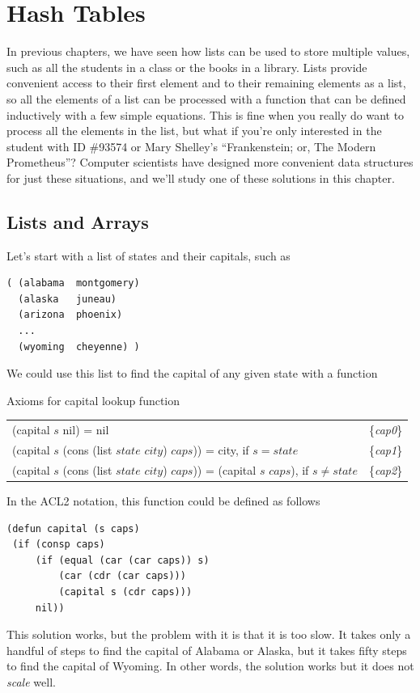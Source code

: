 \chapter{Hash Tables}
\label{ch:hash-tables}

In previous chapters, we have seen how lists can be used to store
multiple values, such as all the students in a class or the books
in a library. Lists provide convenient access to their first element 
and to their remaining elements as a list, so all the elements of a 
list can be processed with a function that can be defined inductively
with a few simple equations.  This is fine when you really do want to 
process all the elements in the list, but what if you're only interested 
in the student with ID \#93574 or Mary Shelley's ``Frankenstein; or, 
The Modern Prometheus''? Computer scientists have designed more convenient
data structures for just these situations, and we'll study one of these
solutions in this chapter. 

\section{Lists and Arrays}

Let's start with a list of states and their capitals, such as
\begin{Verbatim}
( (alabama  montgomery)
  (alaska   juneau)
  (arizona  phoenix)
  ...
  (wyoming  cheyenne) )
\end{Verbatim}
We could use this list to find the capital of any given state with a
function 
\begin{center}
Axioms for capital lookup function
\begin{tabular}{ll}
(capital $s$ nil) = nil  & \{\emph{cap0}\}     \\
(capital $s$ (cons (list $state$ $city$) $caps$)) = city, if $s=state$ & \{\emph{cap1}\} \\
(capital $s$ (cons (list $state$ $city$) $caps$)) = (capital $s$ $caps$), if $s \ne state$ & \{\emph{cap2}\} \\
\end{tabular}
\end{center}
In the ACL2 notation, this function could be defined as follows
\begin{Verbatim}
(defun capital (s caps)
 (if (consp caps)
     (if (equal (car (car caps)) s)
         (car (cdr (car caps)))
         (capital s (cdr caps)))
     nil))
\end{Verbatim}
This solution works, but the problem with it is that it is too slow.
It takes only a handful of steps to find the capital of Alabama or
Alaska, but it takes fifty steps to find the capital of Wyoming.
In other words, the solution works but it does not \emph{scale} well.

